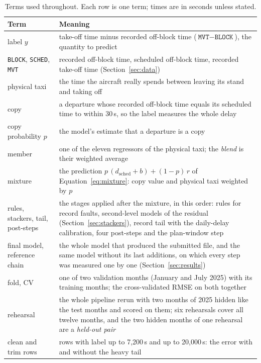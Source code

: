 \documentclass[
  manuscript=article,
  layout=preprint,
  year=2026,
  volume=x,
]{extra/joas}
\newcommand{\fld}[1]{\texttt{#1}}
\begin{document}
\begin{table}[htbp!]
  \centering
  \small
  \caption{Terms used throughout. Each row is one term; times are in seconds unless stated.}
  \label{tb:terms}
  \begin{tabular}{L{0.24\textwidth}L{0.68\textwidth}}
  \toprule
  \textbf{Term} & \textbf{Meaning} \\
  \midrule
  label $y$ & take-off time minus recorded off-block time ($\fld{MVT} - \fld{BLOCK}$), the quantity to predict \\
  \fld{BLOCK}, \fld{SCHED}, \fld{MVT} & recorded off-block time, scheduled off-block time, recorded take-off time (Section~\ref{sec:data}) \\
  physical taxi & the time the aircraft really spends between leaving its stand and taking off \\
  copy & a departure whose recorded off-block time equals its scheduled time to within 30\,s, so the label measures the whole delay \\
  copy probability $p$ & the model's estimate that a departure is a copy \\
  member & one of the eleven regressors of the physical taxi; the \emph{blend} is their weighted average \\
  mixture & the prediction $p\,(d_{\mathrm{sched}}+b) + (1-p)\,r$ of Equation~\ref{eq:mixture}: copy value and physical taxi weighted by $p$ \\
  rules, stackers, tail, post-steps & the stages applied after the mixture, in this order: rules for record faults, second-level models of the residual (Section~\ref{sec:stackers}), record tail with the daily-delay calibration, four post-steps and the plan-window step \\
  final model, reference chain & the whole model that produced the submitted file, and the same model without its last additions, on which every step was measured one by one (Section~\ref{sec:results}) \\
  fold, CV & one of two validation months (January and July 2025) with its training months; the cross-validated RMSE on both together \\
  rehearsal & the whole pipeline rerun with two months of 2025 hidden like the test months and scored on them; six rehearsals cover all twelve months, and the two hidden months of one rehearsal are a \emph{held-out pair} \\
  clean and trim rows & rows with label up to 7,200\,s and up to 20,000\,s: the error with and without the heavy tail \\
  \bottomrule
  \end{tabular}
\end{table}
\end{document}
